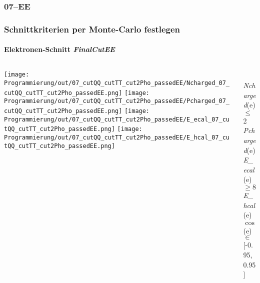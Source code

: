 \documentclass{beamer}
\begin{document}
\subsubsection{07--EE}
\begin{frame}
	\frametitle{Schnittkriterien per Monte-Carlo festlegen}
	\framesubtitle{Elektronen-Schnitt \textit{FinalCutEE}}
	\begin{columns}
		\begin{column}{0.95\textwidth}
			\texttt{[image: Programmierung/out/07\_cutQQ\_cutTT\_cut2Pho\_passedEE/Ncharged\_07\_cutQQ\_cutTT\_cut2Pho\_passedEE.png]}
			\texttt{[image: Programmierung/out/07\_cutQQ\_cutTT\_cut2Pho\_passedEE/Pcharged\_07\_cutQQ\_cutTT\_cut2Pho\_passedEE.png]}
			\newline
			\texttt{[image: Programmierung/out/07\_cutQQ\_cutTT\_cut2Pho\_passedEE/E\_ecal\_07\_cutQQ\_cutTT\_cut2Pho\_passedEE.png]}
			\texttt{[image: Programmierung/out/07\_cutQQ\_cutTT\_cut2Pho\_passedEE/E\_hcal\_07\_cutQQ\_cutTT\_cut2Pho\_passedEE.png]}
		\end{column}
		\begin{column}{0.2\textwidth}
			\\
			{\color{blue}\textit{Ncharged}(e)}\newline
					$\leq$ 2\\
			{\color{blue}\textit{Pcharged}(e)}\newline
					\\
			{\color[rgb]{0.6,0.6,0}\textit{E\_ecal}(e)}\newline
					$\geq 80.0$\\
			{\color[rgb]{1,0,1}\textit{E\_hcal}(e)}\newline
					\\
			$\cos\_thet$(e)\newline
					$\in${\small [-0.95, 0.95]}\\
			\\
			\\
			\\
			\\
		\end{column}
	\end{columns}
\end{frame}
\end{document}

